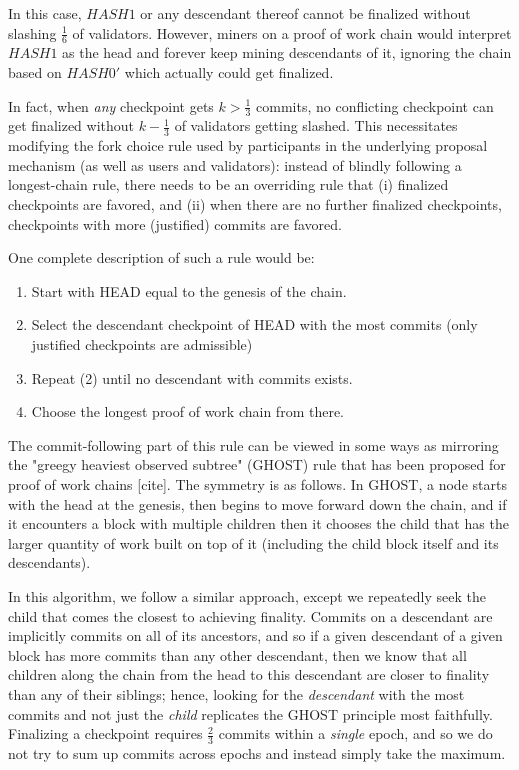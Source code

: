 \documentclass[12pt]{article}
\begin{document}
In this case, $HASH1$ or any descendant thereof cannot be finalized without slashing $\frac{1}{6}$ of validators. However, miners on a proof of work chain would interpret $HASH1$ as the head and forever keep mining descendants of it, ignoring the chain based on $HASH0'$ which actually could get finalized.

In fact, when \textit{any} checkpoint gets $k > \frac{1}{3}$ commits, no conflicting checkpoint can get finalized without $k - \frac{1}{3}$ of validators getting slashed. This necessitates modifying the fork choice rule used by participants in the underlying proposal mechanism (as well as users and validators): instead of blindly following a longest-chain rule, there needs to be an overriding rule that (i) finalized checkpoints are favored, and (ii) when there are no further finalized checkpoints, checkpoints with more (justified) commits are favored.

One complete description of such a rule would be:

\begin{enumerate}
\item Start with HEAD equal to the genesis of the chain.
\item Select the descendant checkpoint of HEAD with the most commits (only justified checkpoints are admissible)
\item Repeat (2) until no descendant with commits exists.
\item Choose the longest proof of work chain from there.
\end{enumerate}

The commit-following part of this rule can be viewed in some ways as mirroring the "greegy heaviest observed subtree" (GHOST) rule that has been proposed for proof of work chains [cite]. The symmetry is as follows. In GHOST, a node starts with the head at the genesis, then begins to move forward down the chain, and if it encounters a block with multiple children then it chooses the child that has the larger quantity of work built on top of it (including the child block itself and its descendants).

In this algorithm, we follow a similar approach, except we repeatedly seek the child that comes the closest to achieving finality. Commits on a descendant are implicitly commits on all of its ancestors, and so if a given descendant of a given block has more commits than any other descendant, then we know that all children along the chain from the head to this descendant are closer to finality than any of their siblings; hence, looking for the \textit{descendant} with the most commits and not just the \textit{child} replicates the GHOST principle most faithfully. Finalizing a checkpoint requires $\frac{2}{3}$ commits within a \textit{single} epoch, and so we do not try to sum up commits across epochs and instead simply take the maximum.
\end{document}
